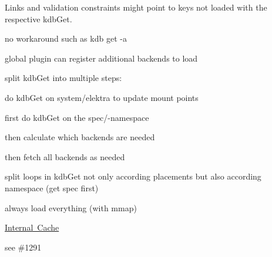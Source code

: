 Links and validation constraints might point to keys not loaded with the respective {\ttfamily kdb\+Get}.


\begin{DoxyItemize}
\item no workaround such as {\ttfamily kdb get -\/a}
\end{DoxyItemize}


\begin{DoxyItemize}
\item global plugin can register additional backends to load
\item split {\ttfamily kdb\+Get} into multiple steps\+:
\begin{DoxyEnumerate}
\item do {\ttfamily kdb\+Get} on {\ttfamily system/elektra} to update mount points
\item first do {\ttfamily kdb\+Get} on the {\ttfamily spec/}-\/namespace
\item then calculate which backends are needed
\item then fetch all backends as needed
\end{DoxyEnumerate}
\item split loops in {\ttfamily kdb\+Get} not only according placements but also according namespace (get spec first)
\end{DoxyItemize}


\begin{DoxyItemize}
\item always load everything (with mmap)
\end{DoxyItemize}


\begin{DoxyItemize}
\item \mbox{\hyperlink{doc_decisions_internal_cache_md}{Internal Cache}}
\end{DoxyItemize}

see \#1291 